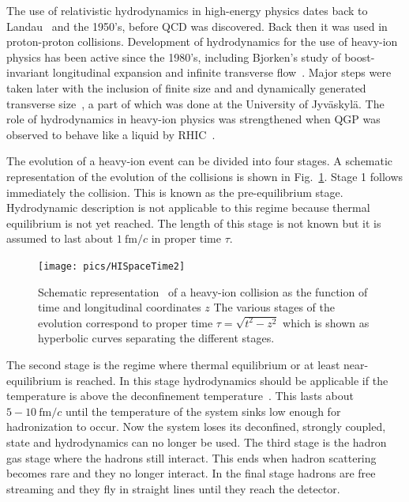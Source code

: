 The use of relativistic hydrodynamics in high-energy physics dates back to Landau~\cite{Landau:1953gs} and the 1950's, before QCD was discovered. Back then it was used in proton-proton collisions. Development of hydrodynamics for the use of heavy-ion physics has been active since the 1980's, including Bjorken's study of boost-invariant longitudinal expansion and infinite transverse flow~\cite{PhysRevD.27.140}. Major steps were taken later with the inclusion of finite size and and dynamically generated transverse size~\cite{Baym1983541, PhysRevD.34.794}, a part of which was done at the University of Jyväskylä. The role of hydrodynamics in heavy-ion physics was strengthened when QGP was observed to behave like a liquid by RHIC~\cite{Adcox:2004mh}. 

The evolution of a heavy-ion event can be divided into four stages. A schematic representation of the evolution of the collisions is shown in Fig.~\ref{fig:HISpaceTime}. Stage 1 follows immediately the collision. This is known as the pre-equilibrium stage. Hydrodynamic description is not applicable to this regime because thermal equilibrium is not yet reached. The length of this stage is not known but it is assumed to last about $1\ \mathrm{fm}/c$ in proper time $\tau$. 

\begin{figure}[htb]
\centering
               \texttt{[image: pics/HISpaceTime2]}
        \caption[Schematic representation of a heavy-ion collision]{Schematic representation~\cite{Romatschke:2009im} of a heavy-ion collision as the function of time and longitudinal coordinates $z$ The various stages of the evolution correspond to proper time $\tau=\sqrt{t^2-z^2}$ which is shown as hyperbolic curves separating the different stages.}
        	\label{fig:HISpaceTime}
\end{figure}

The second stage is the regime where thermal equilibrium or at least near-equilibrium is reached. In this stage hydrodynamics should be applicable if the temperature is above the deconfinement temperature~\cite{Romatschke:2009im}. This lasts about $5-10\ \mathrm{fm}/c$ until the temperature of the system sinks low enough for hadronization to occur. Now the system loses its deconfined, strongly coupled, state and hydrodynamics can no longer be used. The third stage is the hadron gas stage where the hadrons still interact. This ends when hadron scattering becomes rare and they no longer interact. In the final stage hadrons are free streaming and they fly in straight lines until they reach the detector.

